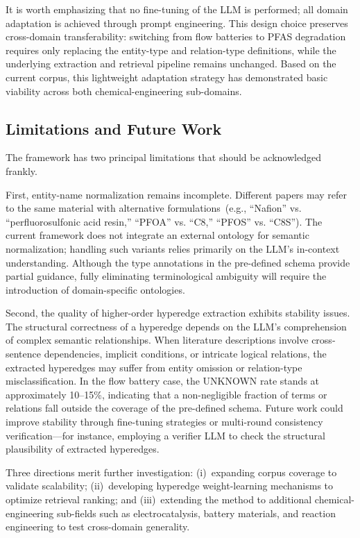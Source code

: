 It is worth emphasizing that no fine-tuning of the LLM is performed; all domain adaptation is achieved through prompt engineering. This design choice preserves cross-domain transferability: switching from flow batteries to PFAS degradation requires only replacing the entity-type and relation-type definitions, while the underlying extraction and retrieval pipeline remains unchanged. Based on the current corpus, this lightweight adaptation strategy has demonstrated basic viability across both chemical-engineering sub-domains.

\subsection{Limitations and Future Work}

The framework has two principal limitations that should be acknowledged frankly.

First, entity-name normalization remains incomplete. Different papers may refer to the same material with alternative formulations~(e.g., ``Nafion'' vs. ``perfluorosulfonic acid resin,'' ``PFOA'' vs. ``C8,'' ``PFOS'' vs. ``C8S''). The current framework does not integrate an external ontology for semantic normalization; handling such variants relies primarily on the LLM's in-context understanding. Although the type annotations in the pre-defined schema provide partial guidance, fully eliminating terminological ambiguity will require the introduction of domain-specific ontologies.

Second, the quality of higher-order hyperedge extraction exhibits stability issues. The structural correctness of a hyperedge depends on the LLM's comprehension of complex semantic relationships. When literature descriptions involve cross-sentence dependencies, implicit conditions, or intricate logical relations, the extracted hyperedges may suffer from entity omission or relation-type misclassification. In the flow battery case, the UNKNOWN rate stands at approximately 10--15\%, indicating that a non-negligible fraction of terms or relations fall outside the coverage of the pre-defined schema. Future work could improve stability through fine-tuning strategies or multi-round consistency verification---for instance, employing a verifier LLM to check the structural plausibility of extracted hyperedges.

Three directions merit further investigation: (i)~expanding corpus coverage to validate scalability; (ii)~developing hyperedge weight-learning mechanisms to optimize retrieval ranking; and (iii)~extending the method to additional chemical-engineering sub-fields such as electrocatalysis, battery materials, and reaction engineering to test cross-domain generality.

